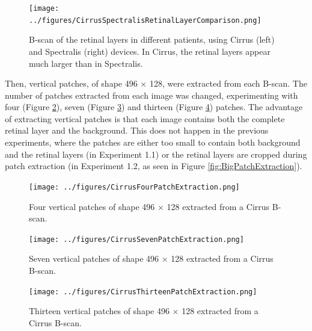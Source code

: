 \begin{figure}[!ht]
	\centering
	\texttt{[image: ../figures/CirrusSpectralisRetinalLayerComparison.png]}
	\caption{B-scan of the retinal layers in different patients, using Cirrus (left) and Spectralis (right) devices. In Cirrus, the retinal layers appear much larger than in Spectralis.}
	\label{fig:CirrusSpectralisRetinalLayerComparison}
\end{figure}

Then, vertical patches, of shape 496 $\times$ 128, were extracted from each B-scan. The number of patches extracted from each image was changed, experimenting with four (Figure \ref{fig:CirrusFourPatchExtraction}), seven (Figure \ref{fig:CirrusSevenPatchExtraction}) and thirteen (Figure \ref{fig:CirrusThirteenPatchExtraction}) patches. The advantage of extracting vertical patches is that each image contains both the complete retinal layer and the background. This does not happen in the previous experiments, where the patches are either too small to contain both background and the retinal layers (in Experiment 1.1) or the retinal layers are cropped during patch extraction (in Experiment 1.2, as seen in Figure \ref{fig:BigPatchExtraction}).

\begin{figure}[!ht]
	\centering
	\texttt{[image: ../figures/CirrusFourPatchExtraction.png]}
	\caption{Four vertical patches of shape 496 $\times$ 128 extracted from a Cirrus B-scan.}
	\label{fig:CirrusFourPatchExtraction}
\end{figure}

\begin{figure}[!ht]
	\centering
	\texttt{[image: ../figures/CirrusSevenPatchExtraction.png]}
	\caption{Seven vertical patches of shape 496 $\times$ 128 extracted from a Cirrus B-scan.}
	\label{fig:CirrusSevenPatchExtraction}
\end{figure}


\begin{figure}[!ht]
	\centering
	\texttt{[image: ../figures/CirrusThirteenPatchExtraction.png]}
	\caption{Thirteen vertical patches of shape 496 $\times$ 128 extracted from a Cirrus B-scan.}
	\label{fig:CirrusThirteenPatchExtraction}
\end{figure}

